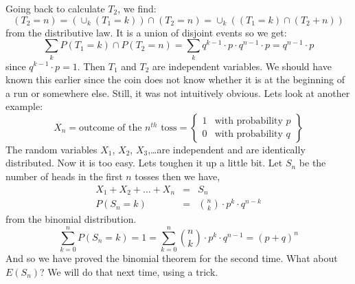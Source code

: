Going back to calculate $T_2$, we find:
\begin{equation}
(T_2 =n)=(\cup_{k}(T_1=k))\cap(T_2=n)= \cup_{k}((T_1=k)\cap(T_2+n))
\end{equation}
from the distributive law. It is a union of disjoint events so we get:
\begin{equation}
\sum_{k}P(T_1=k) \cap P(T_2=n)=\sum_{k}q^{k-1} \cdot p \cdot q^{n-1}
\cdot p = q^{n-1} \cdot p
\end{equation}
since $ q^{k-1} \cdot p = 1$. Then $T_1$ and $T_2$ are independent
variables. We should have known this earlier  since the coin does not
know whether it is at the beginning of a run or somewhere else. Still,
it was not intuitively obvious.
Lets look at another example:
\begin{equation}
X_{n}= \mbox{outcome of the $n^{th}$ toss} = \left\{
 \begin {array}{rcl}
1 & \mbox{with probability } p\\
0 & \mbox{with probability } q \end{array} \right\}
\end{equation}
The random variables $X_1$, $X_2$, $X_3$,\ldots are independent and
are identically distributed. Now it is too easy. Lets toughen it up a
little bit. Let $S_n$ be the number of heads in the first $n$ tosses
then we have,
\begin{eqnarray}
X_1 + X_2 + \ldots +X_n &=& S_n\\
P(S_n=k)&=& {{n} \choose {k}} \cdot p^k \cdot q^{n-k}
\end{eqnarray} 
from the binomial distribution.
\begin{equation}
\sum_{k=0}^{n}P(S_n=k)= 1 = \sum_{k=0}^{n}{{n} \choose {k}} \cdot
p^k \cdot q^{n-1} = (p+q)^{n}
\end{equation}
And so we have proved the binomial theorem for the second time. 
What about $E(S_n)$? We will do that next time, using a trick.

